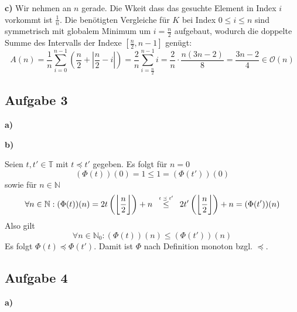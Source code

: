 \documentclass[a4paper,graphics,11pt]{article}
\newcommand{\aufgabe}[1]{\subsection*{Aufgabe #1}}
\newcommand{\up}[2]{\mathrel{\overset{\makebox[0pt]{\mbox{\normalfont\tiny #2}}}{#1}}}
\begin{document}
\textbf{c)} 
Wir nehmen an $n$ gerade. Die Wkeit dass das gesuchte Element in Index $i$ vorkommt ist $\frac{1}{n}$.
Die benötigten Vergleiche für $K$ bei Index $0\leq i \leq n$
sind symmetrisch mit globalem Minimum um $i = \frac{n}{2}$ aufgebaut, wodurch die doppelte Summe des
Intervalls der Indexe $[\frac{n}{2}, n-1]$ genügt:
$$
    A(n)
    = \frac{1}{n} \sum_{i=0}^{n-1}\left( \frac{n}{2} + \left|\frac{n}{2} -i\right|\right)
    = \frac{2}{n} \sum_{i=\frac{n}{2}}^{n-1} i
    = \frac{2}{n} \cdot \frac{n(3n-2)}{8}
    = \frac{3n-2}{4} \in \mathcal{O}(n)
$$

\newpage
\aufgabe{3}
\textbf{a)}

\textbf{b)}

Seien $t, t' \in \mathbb{T}$ mit $t \preceq t'$ gegeben. Es folgt für $n = 0$
$$
    (\Phi(t))(0) = 1 \leq 1 = (\Phi(t'))(0)
$$
sowie für $n \in \mathbb{N}$
$$
    \forall n \in \mathbb{N}: (\Phi(t))(n)
    = 2t\left(\bigg\lfloor\frac{n}{2}\bigg\rfloor\right)+n
    \quad\up{\leq}{$t \preceq t'$}\quad
    2t'\left(\bigg\lfloor\frac{n}{2}\bigg\rfloor\right)+n
    = (\Phi(t'))(n)
$$
Also gilt
$$
    \forall n \in \mathbb{N}_0 : (\Phi(t))(n) \leq (\Phi(t'))(n)
$$
Es folgt $\Phi(t) \preceq \Phi(t')$. Damit ist $\Phi$ nach Definition monoton bzgl. $\preceq$.
\newpage
\aufgabe{4}
\textbf{a)}
\end{document}
